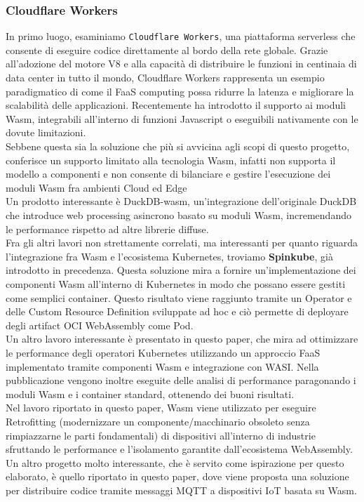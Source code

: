 \subsubsection{Cloudflare Workers}
In primo luogo, esaminiamo \texttt{Cloudflare Workers}\cite{cloudflare_workers}, una piattaforma serverless che consente di eseguire codice direttamente al bordo della rete globale. Grazie all’adozione del motore V8 e alla capacità di distribuire le funzioni in centinaia di data center in tutto il mondo, Cloudflare Workers rappresenta un esempio paradigmatico di come il FaaS computing possa ridurre la latenza e migliorare la scalabilità delle applicazioni. Recentemente ha introdotto il supporto ai moduli Wasm, integrabili all'interno di funzioni Javascript o eseguibili nativamente con le dovute limitazioni.\\
Sebbene questa sia la soluzione che più si avvicina agli scopi di questo progetto, conferisce un supporto limitato alla tecnologia Wasm, infatti non supporta il modello a componenti e non consente di bilanciare e gestire l'esecuzione dei moduli Wasm fra ambienti Cloud ed Edge\\
Un prodotto interessante è DuckDB-wasm\cite{Kohn2022DuckDB-wasm}, un'integrazione dell'originale DuckDB che introduce web processing asincrono basato su moduli Wasm, incremendando le performance rispetto ad altre librerie diffuse.\\
Fra gli altri lavori non strettamente correlati, ma interessanti per quanto riguarda l'integrazione fra Wasm e l'ecosistema Kubernetes, troviamo \textbf{Spinkube}, già introdotto in precedenza. Questa soluzione mira a fornire un'implementazione dei componenti Wasm all'interno di Kubernetes in modo che possano essere gestiti come semplici container. Questo risultato viene raggiunto tramite un Operator e delle Custom Resource Definition sviluppate ad hoc e ciò permette di deployare degli artifact OCI WebAssembly come Pod.\\
Un altro lavoro interessante è presentato in questo paper\cite{9978884}, che mira ad ottimizzare le performance degli operatori Kubernetes utilizzando un approccio FaaS implementato tramite componenti Wasm e integrazione con WASI. Nella pubblicazione vengono inoltre eseguite delle analisi di performance paragonando i moduli Wasm e i container standard, ottenendo dei buoni risultati.\\
Nel lavoro riportato in questo paper\cite{Nakakaze24}, Wasm viene utilizzato per eseguire Retrofitting (modernizzare un componente/macchinario obsoleto senza rimpiazzarne le parti fondamentali) di dispositivi all'interno di industrie sfruttando le performance e l'isolamento garantite dall'ecosistema WebAssembly.\\
Un altro progetto molto interessante, che è servito come ispirazione per questo elaborato, è quello riportato in questo paper\cite{dcoss}, dove viene proposta una soluzione per distribuire codice tramite messaggi MQTT a dispositivi IoT basata su Wasm.\\

